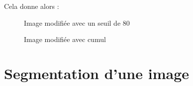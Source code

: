\documentclass[french,a4paper,10pt]{article}
\begin{document}
	Cela donne alors :
	\begin{figure}[!htb]
		\begin{minipage}{0.48\textwidth}
			\centering
			\caption{Image modifiée avec un seuil de 80}\label{Fig:test-grey-08-7}
		\end{minipage}\hfill
		\begin{minipage}{0.48\textwidth}
			\centering
			\caption{Image modifiée avec cumul}\label{Fig:fermeture-ouverture-test-grey-08-2}
		\end{minipage}
	\end{figure}

	\newpage
	\section{Segmentation d'une image}\label{sec:4}
\end{document}
